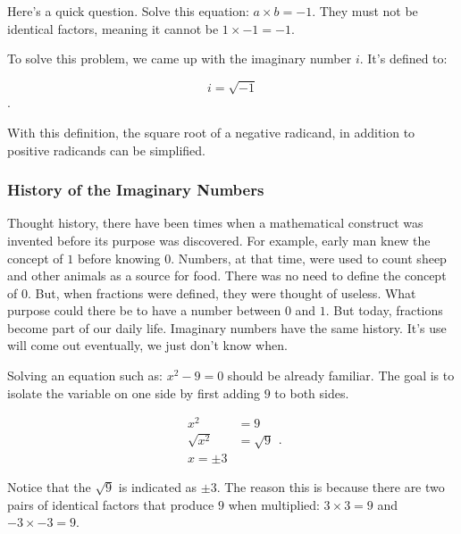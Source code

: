 
\begin{definition}
  \label{def:imaginary_numbers}

  Here's a quick question. Solve this equation: $a \times b = -1$. They must not
  be identical factors, meaning it cannot be $1 \times -1 = -1$.

  To solve this problem, we came up with the imaginary number $i$. It's defined
  to:

  \[ i = \sqrt{-1} \].

  With this definition, the square root of a negative radicand, in addition to
  positive radicands can be simplified.
\end{definition}

\subsubsection{History of the Imaginary Numbers}
\label{sub_sub_sec:history_of_the_imaginary_numbers}

Thought history, there have been times when a mathematical construct was
invented before its purpose was discovered. For example, early man knew the
concept of $1$ before knowing $0$. Numbers, at that time, were used to count
sheep and other animals as a source for food. There was no need to define the
concept of $0$. But, when fractions were defined, they were thought of useless.
What purpose could there be to have a number between $0$ and $1$. But today,
fractions become part of our daily life. Imaginary numbers have the same
history. It's use will come out eventually, we just don't know when.

Solving an equation such as: $x^{2} - 9 = 0$ should be already familiar. The
goal is to isolate the variable on one side by first adding $9$ to both sides.

\begin{equation}
  \label{eqt:history_of_the_imaginary_numbers_1}
  \begin{split}
    x^{2} &= 9 \\
    \sqrt{x^{2}} &= \sqrt{9} \\
    \boxed{x = \pm 3}
  \end{split}
.\end{equation}

Notice that the $\sqrt{9}$ is indicated as  $\pm 3$. The reason this is because
there are two pairs of identical factors that produce $9$ when multiplied: $3
\times 3 = 9$ and $-3 \times -3 = 9$.

